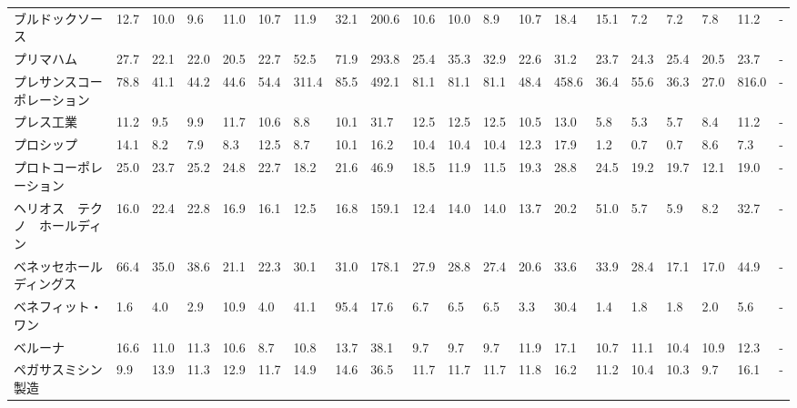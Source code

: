 \begin{longtable}[c]{lp{3mm}p{3mm}p{3mm}p{3mm}p{3mm}p{3mm}p{3mm}p{3mm}p{3mm}p{3mm}p{3mm}p{3mm}p{3mm}p{3mm}p{3mm}p{3mm}p{3mm}p{3mm}p{3mm}}
ブルドックソース        &   12.7 &   10.0 &       9.6 &      11.0 &       10.7 &    11.9 &    32.1 &    200.6 &    10.6 &    10.0 &    8.9 &   10.7 &    18.4 &    15.1 &     7.2 &    7.2 &    7.8 &    11.2 &      - \\
プリマハム           &   27.7 &   22.1 &      22.0 &      20.5 &       22.7 &    52.5 &    71.9 &    293.8 &    25.4 &    35.3 &   32.9 &   22.6 &    31.2 &    23.7 &    24.3 &   25.4 &   20.5 &    23.7 &      - \\
プレサンスコーポレーション   &   78.8 &   41.1 &      44.2 &      44.6 &       54.4 &   311.4 &    85.5 &    492.1 &    81.1 &    81.1 &   81.1 &   48.4 &   458.6 &    36.4 &    55.6 &   36.3 &   27.0 &   816.0 &      - \\
プレス工業           &   11.2 &    9.5 &       9.9 &      11.7 &       10.6 &     8.8 &    10.1 &     31.7 &    12.5 &    12.5 &   12.5 &   10.5 &    13.0 &     5.8 &     5.3 &    5.7 &    8.4 &    11.2 &      - \\
プロシップ           &   14.1 &    8.2 &       7.9 &       8.3 &       12.5 &     8.7 &    10.1 &     16.2 &    10.4 &    10.4 &   10.4 &   12.3 &    17.9 &     1.2 &     0.7 &    0.7 &    8.6 &     7.3 &      - \\
プロトコーポレーション     &   25.0 &   23.7 &      25.2 &      24.8 &       22.7 &    18.2 &    21.6 &     46.9 &    18.5 &    11.9 &   11.5 &   19.3 &    28.8 &    24.5 &    19.2 &   19.7 &   12.1 &    19.0 &      - \\
ヘリオス　テクノ　ホールディン &   16.0 &   22.4 &      22.8 &      16.9 &       16.1 &    12.5 &    16.8 &    159.1 &    12.4 &    14.0 &   14.0 &   13.7 &    20.2 &    51.0 &     5.7 &    5.9 &    8.2 &    32.7 &      - \\
ベネッセホールディングス    &   66.4 &   35.0 &      38.6 &      21.1 &       22.3 &    30.1 &    31.0 &    178.1 &    27.9 &    28.8 &   27.4 &   20.6 &    33.6 &    33.9 &    28.4 &   17.1 &   17.0 &    44.9 &      - \\
ベネフィット・ワン       &    1.6 &    4.0 &       2.9 &      10.9 &        4.0 &    41.1 &    95.4 &     17.6 &     6.7 &     6.5 &    6.5 &    3.3 &    30.4 &     1.4 &     1.8 &    1.8 &    2.0 &     5.6 &      - \\
ベルーナ            &   16.6 &   11.0 &      11.3 &      10.6 &        8.7 &    10.8 &    13.7 &     38.1 &     9.7 &     9.7 &    9.7 &   11.9 &    17.1 &    10.7 &    11.1 &   10.4 &   10.9 &    12.3 &      - \\
ペガサスミシン製造       &    9.9 &   13.9 &      11.3 &      12.9 &       11.7 &    14.9 &    14.6 &     36.5 &    11.7 &    11.7 &   11.7 &   11.8 &    16.2 &    11.2 &    10.4 &   10.3 &    9.7 &    16.1 &      - \\

\end{longtable}
